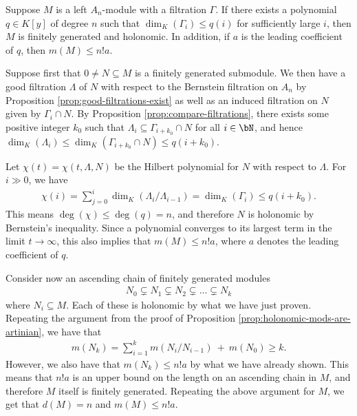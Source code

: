 \begin{lem}\label{lem:bounded-filtration-holonomic}
	Suppose $M$ is a left $A_n$-module with a filtration $\Gamma$. If there exists a polynomial $q \in K[y]$ of degree $n$ such that $\dim_K(\Gamma_i) \leq q(i)$ for sufficiently large $i$, then $M$ is finitely generated and holonomic. In addition, if $a$ is the leading coefficient of $q$, then $m(M) \leq n!a$.
\end{lem}
\begin{prf}
	Suppose first that $0 \neq N \subseteq M$ is a finitely generated submodule. We then have a good filtration $\Lambda$ of $N$ with respect to the Bernstein filtration on $A_n$ by Proposition \ref{prop:good-filtrations-exist} as well as an induced filtration on $N$ given by $\Gamma_i \cap N$. By Proposition \ref{prop:compare-filtrations}, there exists some positive integer $k_0$ such that $\Lambda_{i}\subseteq \Gamma_{i + k_0}\cap N$ for all $i \in \bN$, and hence $\dim_K (\Lambda_i) \leq \dim_K(\Gamma_{i+k_0}\cap N) \leq q(i+k_0)$. 
	
	Let $\chi(t) = \chi(t,\Lambda,N)$ be the Hilbert polynomial for $N$ with respect to $\Lambda$. For $i\gg 0$, we have
	\begin{align*}
		\chi(i) = \sum_{j=0}^i \dim_K(\Lambda_i/\Lambda_{i-1}) = \dim_K(\Gamma_i) \leq q(i+k_0).
	\end{align*}
	This means $\deg(\chi) \leq \deg(q) = n$, and therefore $N$ is holonomic by Bernstein's inequality. Since a polynomial converges to its largest term in the limit $t \to \infty$, this also implies that $m(M) \leq n!a$, where $a$ denotes the leading coefficient of $q$.

	Consider now an ascending chain of finitely generated modules
	\begin{align*}
		N_0 \subsetneq N_1\subsetneq N_2 \subsetneq ... \subsetneq N_k
	\end{align*}
	where $N_i \subseteq M$. Each of these is holonomic by what we have just proven. Repeating the argument from the proof of Proposition \ref{prop:holonomic-mods-are-artinian}, we have that
	\begin{align*}
		m(N_k) = \sum_{i=1}^{k} m(N_i/N_{i-1}) ~+~ m(N_0) \geq k.
	\end{align*}
	However, we also have that $m(N_k) \leq n!a$ by what we have already shown. This means that $n!a$ is an upper bound on the length on an ascending chain in $M$, and therefore $M$ itself is finitely generated. Repeating the above argument for $M$, we get that $d(M) = n$ and $m(M) \leq n!a$.
\end{prf}

